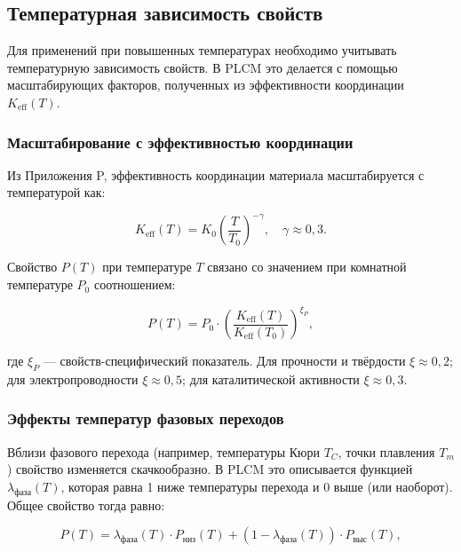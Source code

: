 \documentclass[12pt,a4paper]{article}
\newcommand{\Keff}{K_{\mathrm{eff}}}
\begin{document}
	\subsection{Температурная зависимость свойств}
	\label{subsec:temperature-dependence}
	
	Для применений при повышенных температурах необходимо учитывать температурную зависимость свойств. В PLCM это делается с помощью масштабирующих факторов, полученных из эффективности координации \(\Keff(T)\).
	
	\subsubsection{Масштабирование с эффективностью координации}
	
	Из Приложения P, эффективность координации материала масштабируется с температурой как:
	
	\begin{equation}
		\Keff(T) = K_0 \left( \frac{T}{T_0} \right)^{-\gamma}, \quad \gamma \approx 0,3.
		\label{eq:keff-T}
	\end{equation}
	
	Свойство \(P(T)\) при температуре \(T\) связано со значением при комнатной температуре \(P_0\) соотношением:
	
	\begin{equation}
		P(T) = P_0 \cdot \left( \frac{\Keff(T)}{\Keff(T_0)} \right)^{\xi_P},
		\label{eq:property-T-scaling}
	\end{equation}
	
	где \(\xi_P\) — свойств-специфический показатель. Для прочности и твёрдости \(\xi \approx 0,2\); для электропроводности \(\xi \approx 0,5\); для каталитической активности \(\xi \approx 0,3\).
	
	\subsubsection{Эффекты температур фазовых переходов}
	
	Вблизи фазового перехода (например, температуры Кюри \(T_C\), точки плавления \(T_m\)) свойство изменяется скачкообразно. В PLCM это описывается функцией \(\lambda_{\text{фаза}}(T)\), которая равна 1 ниже температуры перехода и 0 выше (или наоборот). Общее свойство тогда равно:
	
	\begin{equation}
		P(T) = \lambda_{\text{фаза}}(T) \cdot P_{\text{низ}}(T) + (1-\lambda_{\text{фаза}}(T)) \cdot P_{\text{выс}}(T),
		\label{eq:phase-transition}
	\end{equation}
	
\end{document}
